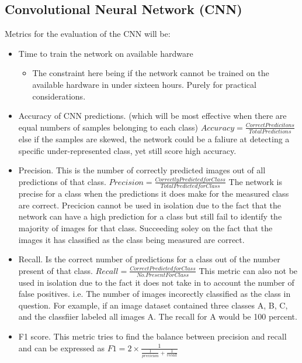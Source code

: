   \subsection{Convolutional Neural Network (CNN)}
  Metrics for the evaluation of the CNN will be:
  \begin{itemize}
    \item Time to train the network on available hardware
    \begin{itemize}
      \item The constraint here being if the network cannot be trained on the available hardware in under sixteen hours. Purely for practical considerations.
    \end{itemize}
    \item Accuracy of CNN predictions. (which will be most effective when there are equal numbers of samples belonging to each class) $Accuracy = \frac{Correct Predicitons}{Total Predictions}$ else if the samples are skewed, the network could be a faliure at detecting a specific under-represented class, yet still score high accuracy.
    \item Precision. This is the number of correctly predicted images out of all predictions of that class. $Precision = \frac{Correctly Predicted for Class}{Total Predicted for Class}$ The network is precise for a class when the predictions it does make for the measured class are correct. Precicion cannot be used in isolation due to the fact that the network can have a high prediction for a class but still fail to identify the majority of images for that class. Succeeding soley on the fact that the images it has classified as the class being measured are correct.
    \item Recall. Is the correct number of predictions for a class out of the number present of that class. $Recall = \frac{Correct Predicted for Class}{No. Present For Class}$
    This metric can also not be used in isolation due to the fact it does not take in to account the number of false positives. i.e. The number of images incorectly classified as the class in question. For example, if an image dataset contained three classes A, B, C, and the classfiier labeled all images A. The recall for A would be 100 percent.
    \item F1 score. This metric tries to find the balance between precision and recall and can be expressed as $F1 = 2 \times \frac{1}{\frac{1}{precicion} + \frac{1}{recall}}$
  \end{itemize}
